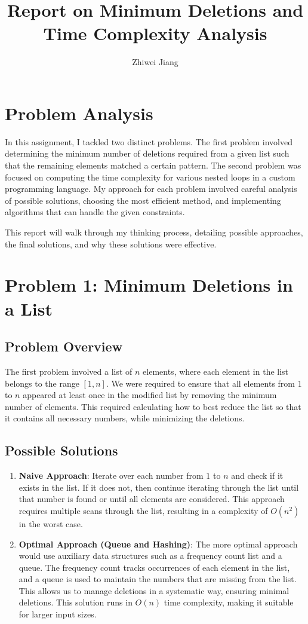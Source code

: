 \documentclass{article}
\title{Report on Minimum Deletions and Time Complexity Analysis}
\author{Zhiwei Jiang}
\begin{document}
\maketitle

\section{Problem Analysis}
In this assignment, I tackled two distinct problems. The first problem involved determining the minimum number of deletions required from a given list such that the remaining elements matched a certain pattern. The second problem was focused on computing the time complexity for various nested loops in a custom programming language. My approach for each problem involved careful analysis of possible solutions, choosing the most efficient method, and implementing algorithms that can handle the given constraints.

This report will walk through my thinking process, detailing possible approaches, the final solutions, and why these solutions were effective.

\section{Problem 1: Minimum Deletions in a List}

\subsection{Problem Overview}
The first problem involved a list of $n$ elements, where each element in the list belongs to the range $[1, n]$. We were required to ensure that all elements from $1$ to $n$ appeared at least once in the modified list by removing the minimum number of elements. This required calculating how to best reduce the list so that it contains all necessary numbers, while minimizing the deletions.

\subsection{Possible Solutions}
\begin{enumerate}
    \item \textbf{Naive Approach}: Iterate over each number from $1$ to $n$ and check if it exists in the list. If it does not, then continue iterating through the list until that number is found or until all elements are considered. This approach requires multiple scans through the list, resulting in a complexity of $O(n^2)$ in the worst case.
    
    \item \textbf{Optimal Approach (Queue and Hashing)}: The more optimal approach would use auxiliary data structures such as a frequency count list and a queue. The frequency count tracks occurrences of each element in the list, and a queue is used to maintain the numbers that are missing from the list. This allows us to manage deletions in a systematic way, ensuring minimal deletions. This solution runs in $O(n)$ time complexity, making it suitable for larger input sizes.
\end{enumerate}
\end{document}
